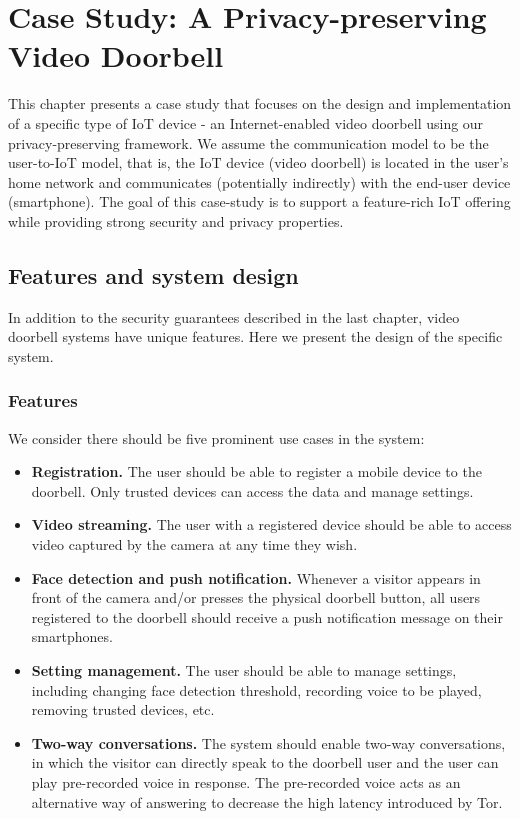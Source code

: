 \chapter{Case Study: A Privacy-preserving Video Doorbell}
\label{sec:case_study}
This chapter presents a case study that focuses on the design and implementation of a specific type of IoT device - an Internet-enabled video doorbell using our privacy-preserving framework. We assume the communication model to be the user-to-IoT model, that is,  the IoT device (video doorbell) is located in the user’s home network and communicates (potentially indirectly) with the end-user device (smartphone). The goal of this case-study is to support a feature-rich IoT offering while providing strong security and privacy properties.

\section{Features and system design}
In addition to the security guarantees described in the last chapter, video doorbell systems have unique features. Here we present the design of the specific system.

\subsection{Features}
We consider there should be five prominent use cases in the system:
\begin{itemize}
	\item \textbf{Registration.} The user should be able to register a mobile device to the doorbell. Only trusted devices can access the data and manage settings.
	\item \textbf{Video streaming.} The user with a registered device should be able to access video captured by the camera at any time they wish.
	\item \textbf{Face detection and push notification.} Whenever a visitor appears in front of the camera and/or presses the physical doorbell button, all users registered to the doorbell should receive a push notification message on their smartphones.
	\item \textbf{Setting management.} The user should be able to manage settings, including changing face detection threshold, recording voice to be played, removing trusted devices, etc.
	\item \textbf{Two-way conversations.} The system should enable two-way conversations, in which the visitor can directly speak to the doorbell user and the user can play pre-recorded voice in response. The pre-recorded voice acts as an alternative way of answering to decrease the high latency introduced by Tor.
\end{itemize}

